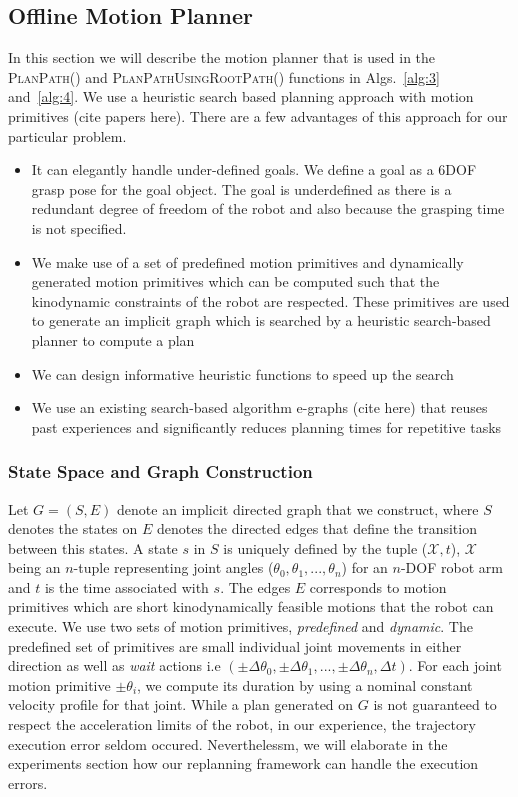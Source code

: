 \subsection{Offline Motion Planner}
In this section we will describe the motion planner that is used in the \textsc{PlanPath()} and \textsc{PlanPathUsingRootPath()} functions in Algs.~\ref{alg:3} and~\ref{alg:4}. We use a heuristic search based planning approach with motion primitives (cite papers here). There are a few advantages of this approach for our particular problem.
\begin{itemize}
    \item It can elegantly handle under-defined goals. We define a goal as a 6DOF grasp pose for the goal object. The goal is underdefined as there is a redundant degree of freedom of the robot and also because the grasping time is not specified.
    \item We make use of a set of predefined motion primitives and dynamically generated motion primitives which can be computed such that the kinodynamic constraints of the robot are respected. These primitives are used to generate an implicit graph which is searched by a heuristic search-based planner to compute a plan
    \item We can design informative heuristic functions to speed up the search
    \item We use an existing search-based algorithm e-graphs (cite here) that reuses past experiences and significantly reduces planning times for repetitive tasks
\end{itemize}


\subsubsection{State Space and Graph Construction}

Let $G = (S,E)$ denote an implicit directed graph that we construct, where $S$ denotes the states on $E$ denotes the directed edges that define the transition between this states. A state $s$ in $S$ is uniquely defined by the tuple ($\mathcal{X},t$), $\mathcal{X}$ being an $n$-tuple representing joint angles ($\theta_0, \theta_1, ..., \theta_n$) for an $n$-DOF robot arm and $t$ is the time associated with $s$.
The edges $E$ corresponds to motion primitives which are short kinodynamically feasible motions that the robot can execute. We use two sets of motion primitives, \textit{predefined} and \textit{dynamic}. The predefined set of primitives are small individual joint movements in either direction as well as \textit{wait} actions i.e $(\pm \Delta \theta_0, \pm \Delta \theta_1, ..., \pm \Delta \theta_n, \Delta t)$. For each joint motion primitive $\pm \theta_i$, we compute its duration by using a nominal constant velocity profile for that joint. While a plan generated on $G$ is not guaranteed to respect the acceleration limits of the robot, in our experience, the trajectory execution error seldom occured. Neverthelessm, we will elaborate in the experiments section how our replanning framework can handle the execution errors.

